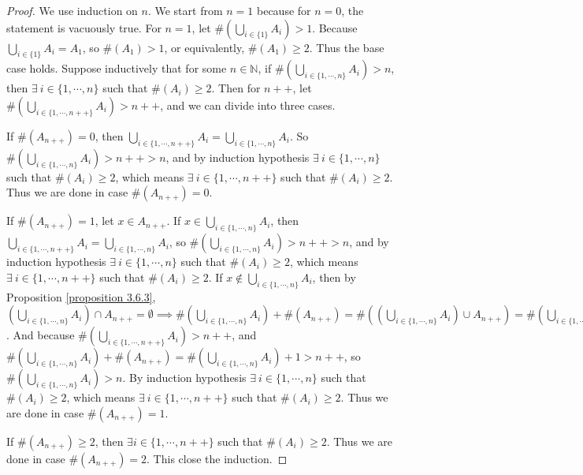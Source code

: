 \begin{proof}
We use induction on \(n\).
We start from \(n = 1\) because for \(n = 0\), the statement is vacuously true.
For \(n = 1\), let \(\#(\bigcup_{i \in \{1\}} A_i) > 1\).
Because \(\bigcup_{i \in \{1\}} A_i = A_1\), so \(\#(A_1) > 1\), or equivalently, \(\#(A_1) \geq 2\).
Thus the base case holds.
Suppose inductively that for some \(n \in \mathds{N}\), if \(\#(\bigcup_{i \in \{1, \cdots, n\}} A_i) > n\), then \(\exists\ i \in \{1, \cdots, n\}\) such that \(\#(A_i) \geq 2\).
Then for \(n++\), let \(\#(\bigcup_{i \in \{1, \cdots, n++\}} A_i) > n++\), and we can divide into three cases.

If \(\#(A_{n++}) = 0\), then \(\bigcup_{i \in \{1, \cdots, n++\}} A_i = \bigcup_{i \in \{1, \cdots, n\}} A_i\).
So \(\#(\bigcup_{i \in \{1, \cdots, n\}} A_i) > n++ > n\), and by induction hypothesis \(\exists\ i \in \{1, \cdots, n\}\) such that \(\#(A_i) \geq 2\), which means \(\exists\ i \in \{1, \cdots, n++\}\) such that \(\#(A_i) \geq 2\).
Thus we are done in case \(\#(A_{n++}) = 0\).

If \(\#(A_{n++}) = 1\), let \(x \in A_{n++}\).
If \(x \in \bigcup_{i \in \{1, \cdots, n\}} A_i\), then \(\bigcup_{i \in \{1, \cdots, n++\}} A_i = \bigcup_{i \in \{1, \cdots, n\}} A_i\), so \(\#(\bigcup_{i \in \{1, \cdots, n\}} A_i) > n++ > n\), and by induction hypothesis \(\exists\ i \in \{1, \cdots, n\}\) such that \(\#(A_i) \geq 2\), which means \(\exists\ i \in \{1, \cdots, n++\}\) such that \(\#(A_i) \geq 2\).
If \(x \notin \bigcup_{i \in \{1, \cdots, n\}} A_i\), then by Proposition \ref{proposition 3.6.3}, \((\bigcup_{i \in \{1, \cdots, n\}} A_i) \cap A_{n++} = \emptyset \implies \#(\bigcup_{i \in \{1, \cdots, n\}} A_i) + \#(A_{n++}) = \#((\bigcup_{i \in \{1, \cdots, n\}} A_i) \cup A_{n++}) = \#(\bigcup_{i \in \{1, \cdots, n++\}} A_i)\).
And because \(\#(\bigcup_{i \in \{1, \cdots, n++\}} A_i) > n++\), and \(\#(\bigcup_{i \in \{1, \cdots, n\}} A_i) + \#(A_{n++}) = \#(\bigcup_{i \in \{1, \cdots, n\}} A_i) + 1 > n++\), so \(\#(\bigcup_{i \in \{1, \cdots, n\}} A_i) > n\).
By induction hypothesis \(\exists\ i \in \{1, \cdots, n\}\) such that \(\#(A_i) \geq 2\), which means \(\exists\ i \in \{1, \cdots, n++\}\) such that \(\#(A_i) \geq 2\).
Thus we are done in case \(\#(A_{n++}) = 1\).

If \(\#(A_{n++}) \geq 2\), then \(\exists i \in \{1, \cdots, n++\}\) such that \(\#(A_i) \geq 2\).
Thus we are done in case \(\#(A_{n++}) = 2\).
This close the induction.
\end{proof}